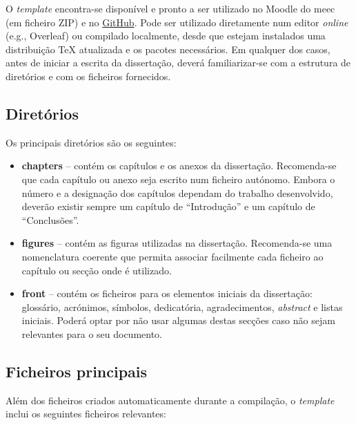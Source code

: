 O \textit{template} encontra-se disponível e pronto a ser utilizado no Moodle do \ac{meec} (em ficheiro ZIP) e no \href{https://github.com/}{GitHub}. Pode ser utilizado diretamente num editor \textit{online} (e.g., Overleaf) ou compilado localmente, desde que estejam instalados uma distribuição \TeX{} atualizada e os pacotes necessários.
Em qualquer dos casos, antes de iniciar a escrita da dissertação, deverá familiarizar-se com a estrutura de diretórios e com os ficheiros fornecidos.

\subsection{Diretórios}

Os principais diretórios são os seguintes:

\begin{itemize}
     \item \textbf{chapters} -- contém os capítulos e os anexos da dissertação. Recomenda-se que cada capítulo ou anexo seja escrito num ficheiro  autónomo. Embora o número e a designação dos capítulos dependam do trabalho desenvolvido, deverão existir sempre um capítulo de ``Introdução'' e um capítulo de ``Conclusões''.

     \item \textbf{figures} -- contém as figuras utilizadas na dissertação. Recomenda-se uma nomenclatura coerente que permita associar facilmente cada ficheiro ao capítulo ou secção onde é utilizado.

     \item \textbf{front} -- contém os ficheiros para os elementos iniciais da dissertação: glossário, acrónimos, símbolos, dedicatória, agradecimentos, \textit{abstract} e listas iniciais. Poderá optar por não usar algumas destas secções caso não sejam relevantes para o seu documento.
\end{itemize}

\subsection{Ficheiros principais}

Além dos ficheiros criados automaticamente durante a compilação, o \textit{template} inclui os seguintes ficheiros relevantes:

